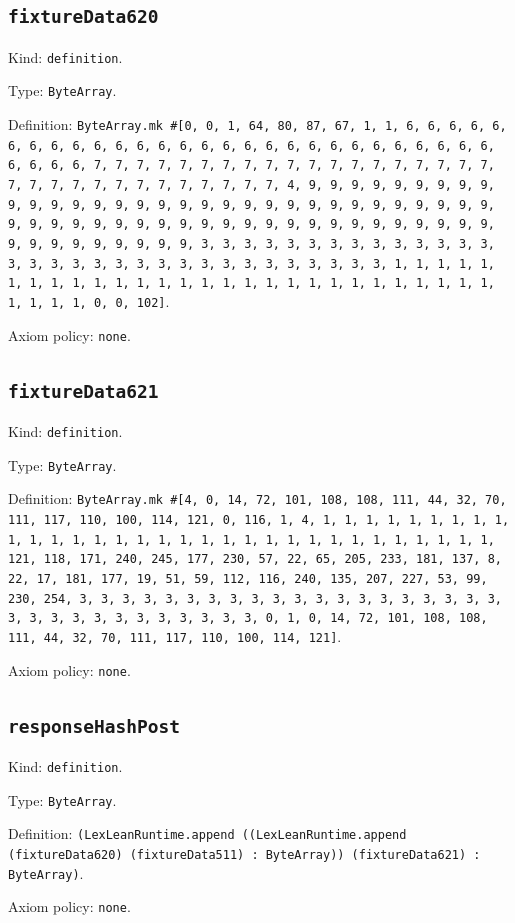 \documentclass[11pt]{article}
\begin{document}
\subsection*{\texttt{fixtureData620}}
\noindent Kind: \texttt{definition}.\par
\noindent Type: \texttt{ByteArray}.\par
\noindent Definition: \texttt{ByteArray.mk \#[0, 0, 1, 64, 80, 87, 67, 1, 1, 6, 6, 6, 6, 6, 6, 6, 6, 6, 6, 6, 6, 6, 6, 6, 6, 6, 6, 6, 6, 6, 6, 6, 6, 6, 6, 6, 6, 6, 6, 6, 6, 7, 7, 7, 7, 7, 7, 7, 7, 7, 7, 7, 7, 7, 7, 7, 7, 7, 7, 7, 7, 7, 7, 7, 7, 7, 7, 7, 7, 7, 7, 7, 7, 4, 9, 9, 9, 9, 9, 9, 9, 9, 9, 9, 9, 9, 9, 9, 9, 9, 9, 9, 9, 9, 9, 9, 9, 9, 9, 9, 9, 9, 9, 9, 9, 9, 9, 9, 9, 9, 9, 9, 9, 9, 9, 9, 9, 9, 9, 9, 9, 9, 9, 9, 9, 9, 9, 9, 9, 9, 9, 9, 9, 9, 9, 9, 9, 9, 3, 3, 3, 3, 3, 3, 3, 3, 3, 3, 3, 3, 3, 3, 3, 3, 3, 3, 3, 3, 3, 3, 3, 3, 3, 3, 3, 3, 3, 3, 3, 3, 1, 1, 1, 1, 1, 1, 1, 1, 1, 1, 1, 1, 1, 1, 1, 1, 1, 1, 1, 1, 1, 1, 1, 1, 1, 1, 1, 1, 1, 1, 1, 1, 0, 0, 102]}.\par
\noindent Axiom policy: \texttt{none}.\par
\subsection*{\texttt{fixtureData621}}
\noindent Kind: \texttt{definition}.\par
\noindent Type: \texttt{ByteArray}.\par
\noindent Definition: \texttt{ByteArray.mk \#[4, 0, 14, 72, 101, 108, 108, 111, 44, 32, 70, 111, 117, 110, 100, 114, 121, 0, 116, 1, 4, 1, 1, 1, 1, 1, 1, 1, 1, 1, 1, 1, 1, 1, 1, 1, 1, 1, 1, 1, 1, 1, 1, 1, 1, 1, 1, 1, 1, 1, 1, 1, 1, 121, 118, 171, 240, 245, 177, 230, 57, 22, 65, 205, 233, 181, 137, 8, 22, 17, 181, 177, 19, 51, 59, 112, 116, 240, 135, 207, 227, 53, 99, 230, 254, 3, 3, 3, 3, 3, 3, 3, 3, 3, 3, 3, 3, 3, 3, 3, 3, 3, 3, 3, 3, 3, 3, 3, 3, 3, 3, 3, 3, 3, 3, 3, 3, 0, 1, 0, 14, 72, 101, 108, 108, 111, 44, 32, 70, 111, 117, 110, 100, 114, 121]}.\par
\noindent Axiom policy: \texttt{none}.\par
\subsection*{\texttt{responseHashPost}}
\noindent Kind: \texttt{definition}.\par
\noindent Type: \texttt{ByteArray}.\par
\noindent Definition: \texttt{(LexLeanRuntime.append ((LexLeanRuntime.append (fixtureData620) (fixtureData511) : ByteArray)) (fixtureData621) : ByteArray)}.\par
\noindent Axiom policy: \texttt{none}.\par
\end{document}
